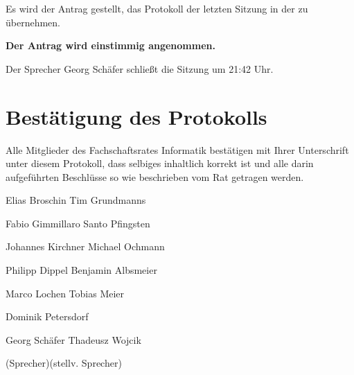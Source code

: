 \documentclass[a4paper, 11pt]{article} %
\begin{document}
Es wird der Antrag gestellt, das Protokoll der letzten Sitzung in der zu übernehmen.
\begin{center}
	\textbf{Der Antrag wird einstimmig angenommen.}
\end{center}

Der Sprecher Georg Schäfer schließt die Sitzung um 21:42 Uhr.

\pagebreak
\section{Bestätigung des Protokolls}
Alle Mitglieder des Fachschaftsrates Informatik bestätigen mit Ihrer Unterschrift unter diesem Protokoll, dass selbiges inhaltlich korrekt ist und alle darin aufgeführten Beschlüsse so wie beschrieben vom Rat getragen werden.
\\
\vspace{1.5cm}

\hrulefill \hfill \hrulefill

Elias Broschin \hfill Tim Grundmanns

\vspace{2.0cm}
\hrulefill \hfill \hrulefill

Fabio Gimmillaro \hfill Santo Pfingsten

\vspace{2.0cm}
\hrulefill \hfill \hrulefill

Johannes Kirchner \hfill Michael Ochmann

\pagebreak
\vspace{2.0cm}
\hrulefill \hfill \hrulefill

Philipp Dippel \hfill Benjamin Albsmeier

\vspace{2.0cm}
\hrulefill \hfill \hrulefill

Marco Lochen \hfill Tobias Meier

\vspace{2.0cm}
\hrulefill \hfill \hfill \hfill

Dominik Petersdorf \hfill \hfill

\vspace{3.5cm}
\hrulefill \hfill \hrulefill

Georg Schäfer \hfill Thadeusz Wojcik

{\footnotesize (Sprecher)\hfill (stellv. Sprecher)}
\end{document}

